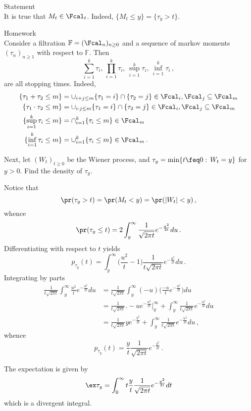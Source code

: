 \noindent Statement\hfill\\
It is true that $M_t\in \Fcal_t$. Indeed, $\{M_t\leq y\} = \{\tau_y > t\}$.

\noindent Homework\hfill\\
Consider a filtration $\mathbb{F} = (\Fcal_n)_{n\geq0}$ and a sequence of markov moments
$(\tau_n)_{n\geq1}$ with respect to $\mathbb{F}$. Then
\[ \sum_{i=1}^k \tau_i,\,\prod_{i=1}^k \tau_i,\,\sup_{i=1}^k \tau_i,\,\inf_{i=1}^k \tau_i \,, \]
are all stopping times. Indeed, \begin{align*}
	\{\tau_1+\tau_2\leq m\} &= \cup_{i+j\leq m}\{\tau_1=i\}\cap \{\tau_2=j\} \in \Fcal_i,\Fcal_j\subseteq \Fcal_m \\
	\{\tau_1\cdot\tau_2\leq m\} &= \cup_{i\cdot j\leq m}\{\tau_1=i\}\cap \{\tau_2=j\} \in \Fcal_i,\Fcal_j\subseteq \Fcal_m \\
	\{\sup_{i=1}^k \tau_i \leq m\} &= \cap_{i=1}^k\{\tau_i\leq m\} \in \Fcal_m \\
	\{\inf_{i=1}^k \tau_i \leq m\} &= \cup_{i=1}^k\{\tau_i\leq m\} \in \Fcal_m \,.
\end{align*}

Next, let $(W_t)_{t\geq0}$ be the Wiener process, and $\tau_y = \min\{t\feq 0:\,W_t=y\}$
for $y>0$. Find the density of $\tau_y$.

Notice that
\[ \pr(\tau_y > t) = \pr(M_t < y ) = \pr( |W_t|<y )\,,\]
whence
\[ \pr(\tau_y\leq t) = 2\int_y^\infty \frac{1}{\sqrt{2\pi t}} e^{-\frac{u^2}{2t}} du \,. \]
Differentiating with respect to $t$ yields
\[ p_{\tau_y}(t)
	= \int_y^\infty \bigl( \frac{u^2}{t} - 1 \bigr)
					\frac{1}{t \sqrt{2\pi t}} e^{-\frac{u^2}{2t}} du \,. \]
Integrating by parts \begin{align*}
	\frac{1}{t \sqrt{2\pi t}} \int_y^\infty \frac{u^2}{t} e^{-\frac{u^2}{2t}} du
		&= \frac{1}{t \sqrt{2\pi t}} \int_y^\infty (-u) \biggl( \frac{-u}{t} e^{-\frac{u^2}{2t}} \biggr)du\\
		&= \frac{1}{t \sqrt{2\pi t}} \bigl.-u e^{-\frac{u^2}{2t}}\bigr\rvert_y^\infty
			+ \int_y^\infty \frac{1}{t \sqrt{2\pi t}} e^{-\frac{u^2}{2t}} du\\
		&= \frac{1}{t \sqrt{2\pi t}} y e^{-\frac{y^2}{2t}}
			+ \int_y^\infty \frac{1}{t \sqrt{2\pi t}} e^{-\frac{u^2}{2t}} du\,,
\end{align*}
whence
\[ p_{\tau_y}(t) = \frac{y}{t} \frac{1}{\sqrt{2\pi t}} e^{-\frac{y^2}{2t}} \,. \]

The expectation is given by
\begin{align*}
	\ex \tau_y &= \int_0^\infty t \frac{y}{t} \frac{1}{\sqrt{2\pi t}} e^{-\frac{y^2}{2t}} dt\\
\end{align*}
which is a divergent integral.

